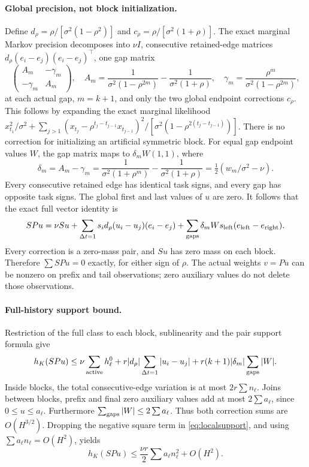 \documentclass[11pt]{article}
\begin{document}
\paragraph{Global precision, not block initialization.}
Define
$d_\rho=\rho/[\sigma^2(1-\rho^2)]$ and
$c_\rho=\rho/[\sigma^2(1+\rho)]$.
The exact marginal Markov precision decomposes into $\nu I$, consecutive
retained-edge matrices $d_\rho(e_i-e_j)(e_i-e_j)^\top$, one gap matrix
\[
 \begin{pmatrix} A_m&-\gamma_m\\-\gamma_m&A_m\end{pmatrix},\quad
 A_m=\frac1{\sigma^2(1-\rho^{2m})}-\frac1{\sigma^2(1+\rho)},\quad
 \gamma_m=\frac{\rho^m}{\sigma^2(1-\rho^{2m})},
\]
at each actual gap, $m=k+1$, and only the two global endpoint corrections
$c_\rho$. This follows by expanding the exact marginal likelihood
$x_{t_1}^2/\sigma^2+\sum_{j>1}(x_{t_j}-\rho^{t_j-t_{j-1}}x_{t_{j-1}})^2/
[\sigma^2(1-\rho^{2(t_j-t_{j-1})})]$.
There is no correction for initializing an artificial symmetric block.
For equal gap endpoint values $W$, the gap matrix maps to
$\delta_m W(1,1)$, where
\begin{equation}\label{eq:delta}
 \delta_m=A_m-\gamma_m
 =\frac1{\sigma^2(1+\rho^m)}-\frac1{\sigma^2(1+\rho)}
 =\tfrac12(w_m/\sigma^2-\nu).
\end{equation}
Every consecutive retained edge has identical task signs, and every gap
has opposite task signs. The global first and last values of $u$ are zero.
It follows that the exact full vector identity is
\begin{equation}\label{eq:pairidentity}
 SPu=\nu Su+
 \sum_{\Delta t=1}s_i d_\rho(u_i-u_j)(e_i-e_j)
 +\sum_{\rm gaps}\delta_m W s_{\rm left}(e_{\rm left}-e_{\rm right}).
\end{equation}
Every correction is a zero-mass pair, and $Su$ has zero mass on each block.
Therefore $\sum SPu=0$ exactly, for either sign of $\rho$.
The actual weights $v=Pu$ can be nonzero on prefix and tail observations;
zero auxiliary values do not delete those observations.

\paragraph{Full-history support bound.}
Restriction of the full class to each block, sublinearity and the pair
support formula give
\begin{equation}\label{eq:supportbound}
 h_K(SPu)\le\nu\sum_{\rm active}h_\ell^0
 +r|d_\rho|\sum_{\Delta t=1}|u_i-u_j|
 +r(k+1)|\delta_m|\sum_{\rm gaps}|W|.
\end{equation}
Inside blocks, the total consecutive-edge variation is at most
$2r\sum n_\ell$. Joins between blocks, prefix and final zero auxiliary
values add at most $2\sum a_\ell$, since $0\le u\le a_\ell$.
Furthermore $\sum_{\rm gaps}|W|\le2\sum a_\ell$.
Thus both correction sums are $O(H^{3/2})$.
Dropping the negative square term in \eqref{eq:localsupport}, and using
$\sum a_\ell n_\ell=O(H^2)$, yields
\begin{equation}\label{eq:supportmain}
 h_K(SPu)\le\frac{\nu r}{2}\sum a_\ell n_\ell^2+O(H^2).
\end{equation}
\end{document}
